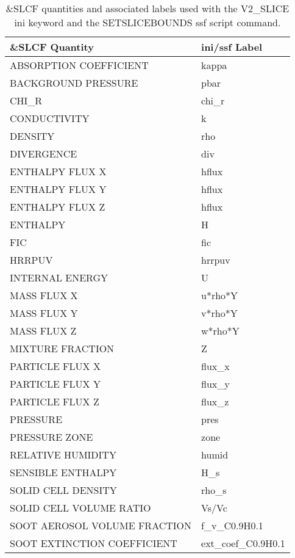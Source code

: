 \begin{table}[bph]
\begin{center}
\caption{\&SLCF quantities and associated labels used with the V2\_SLICE ini keyword and the SETSLICEBOUNDS ssf script command.}
\vspace{0.1in}
\begin{tabular}{|l|l|}
\hline
\&SLCF Quantity & ini/ssf Label \\ \hline
 ABSORPTION COEFFICIENT  &   kappa \\ \hline
 BACKGROUND PRESSURE  &   pbar \\ \hline
 CHI\_R  &   chi\_r \\ \hline
 CONDUCTIVITY  &   k \\ \hline
 DENSITY  &   rho \\ \hline
 DIVERGENCE  &   div \\ \hline
 ENTHALPY FLUX X  &   hflux \\ \hline
 ENTHALPY FLUX Y  &   hflux \\ \hline
 ENTHALPY FLUX Z  &   hflux \\ \hline
 ENTHALPY  &   H \\ \hline
 FIC  &   fic \\ \hline
 HRRPUV  &   hrrpuv \\ \hline
 INTERNAL ENERGY  &   U \\ \hline
 MASS FLUX X  &   u*rho*Y \\ \hline
 MASS FLUX Y  &   v*rho*Y \\ \hline
 MASS FLUX Z  &   w*rho*Y \\ \hline
 MIXTURE FRACTION  &   Z \\ \hline
 PARTICLE FLUX X  &   flux\_x \\ \hline
 PARTICLE FLUX Y  &   flux\_y \\ \hline
 PARTICLE FLUX Z  &   flux\_z \\ \hline
 PRESSURE  &   pres \\ \hline
 PRESSURE ZONE  &   zone \\ \hline
 RELATIVE HUMIDITY  &   humid \\ \hline
 SENSIBLE ENTHALPY  &   H\_s \\ \hline
 SOLID CELL DENSITY  &   rho\_s \\ \hline
 SOLID CELL VOLUME RATIO  &   Vs/Vc \\ \hline
 SOOT AEROSOL VOLUME FRACTION  &   f\_v\_C0.9H0.1 \\ \hline
 SOOT EXTINCTION COEFFICIENT  &   ext\_coef\_C0.9H0.1 \\ \hline

\end{tabular}
\end{center}
\end{table}
